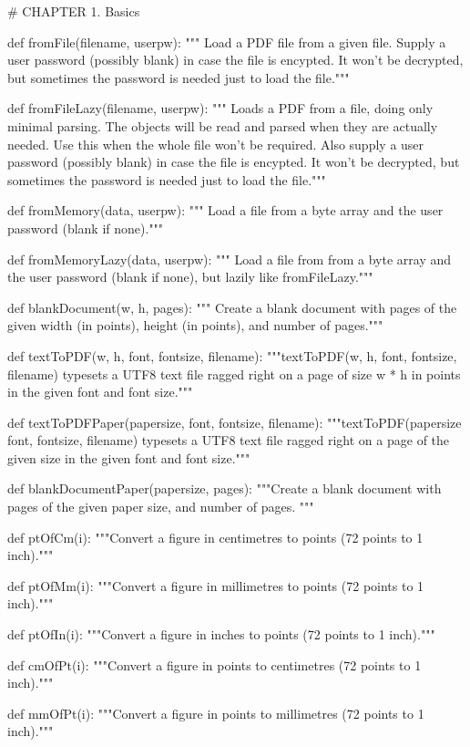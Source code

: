# CHAPTER 1. Basics

def fromFile(filename, userpw):
    """ Load a PDF file from a given file.
    Supply a user password (possibly blank) in case the file is encypted. It
    won't be decrypted, but sometimes the password is needed just to load the
    file."""

def fromFileLazy(filename, userpw):
    """ Loads a PDF from a file, doing only
    minimal parsing. The objects will be read and parsed when they are actually
    needed.  Use this when the whole file won't be required. Also supply a user
    password (possibly blank) in case the file is encypted. It won't be
    decrypted, but sometimes the password is needed just to load the file."""

def fromMemory(data, userpw):
    """ Load a file from a byte array and the user password (blank if none)."""

def fromMemoryLazy(data, userpw):
    """ Load a file from from a byte array and the user password (blank if
    none), but lazily like fromFileLazy."""

def blankDocument(w, h, pages):
    """ Create a blank document
    with pages of the given width (in points), height (in points), and number
    of pages."""

def textToPDF(w, h, font, fontsize, filename):
    """textToPDF(w, h, font, fontsize, filename) typesets a UTF8 text file
    ragged right on a page of size w * h in points in the given font and font
    size."""

def textToPDFPaper(papersize, font, fontsize, filename):
    """textToPDF(papersize font, fontsize, filename) typesets a UTF8 text file
    ragged right on a page of the given size in the given font and font
    size."""

def blankDocumentPaper(papersize, pages):
    """Create a blank document with pages of the given paper size, and number
    of pages. """

def ptOfCm(i):
    """Convert a figure in centimetres to points (72 points to 1 inch)."""

def ptOfMm(i):
    """Convert a figure in millimetres to points (72 points to 1 inch)."""

def ptOfIn(i):
    """Convert a figure in inches to points (72 points to 1 inch)."""

def cmOfPt(i):
    """Convert a figure in points to centimetres (72 points to 1 inch)."""

def mmOfPt(i):
    """Convert a figure in points to millimetres (72 points to 1 inch)."""

